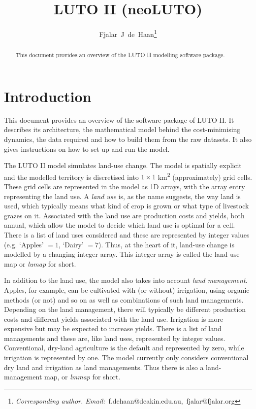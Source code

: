 \documentclass{draft}
\author[]{Fjalar~J~de~Haan\thanks{\textit{Corresponding author. Email:}~f.dehaan@deakin.edu.au,~fjalar@fjalar.org}}
\affil[]{Planet A, Centre for Integrative Ecology, \mbox{Deakin University, Australia}}
\date{}
\begin{document}
\title{LUTO II (neoLUTO)}

\maketitle

\begin{abstract}
	\noindent This document provides an overview of the LUTO II modelling software package.
\end{abstract}

\tableofcontents

\newpage

\section{Introduction}
This document provides an overview of the software package of LUTO II\@. It describes its architecture, the mathematical model behind the cost-minimising dynamics, the data required and how to build them from the raw datasets. It also gives instructions on how to set up and run the model.


The LUTO II model simulates land-use change. The model is spatially explicit and the modelled territory is discretised into $1 \times 1$ km\textsuperscript{2} (approximately) grid cells. These grid cells are represented in the model as 1D arrays, with the array entry representing the land use. A \emph{land use} is, as the name suggests, the way land is used, which typically means what kind of crop is grown or what type of livestock grazes on it. Associated with the land use are production costs and yields, both annual, which allow the model to decide which land use is optimal for a cell. There is a list of land uses considered and these are represented by integer values (e.g. `Apples' $ = 1$, `Dairy' $ = 7$). Thus, at the heart of it, land-use change is modelled by a changing integer array. This integer array is called the land-use map or \emph{lumap} for short.

In addition to the land use, the model also takes into account \emph{land management}. Apples, for example, can be cultivated with (or without) irrigation, using organic methods (or not) and so on as well as combinations of such land managements. Depending on the land management, there will typically be different production costs and different yields associated with the land use. Irrigation is more expensive but may be expected to increase yields. There is a list of land managements and these are, like land uses, represented by integer values. Conventional, dry-land agriculture is the default and represented by zero, while irrigation is represented by one. The model currently only considers conventional dry land and irrigation as land managements. Thus there is also a land-management map, or \emph{lmmap} for short.
\end{document}
